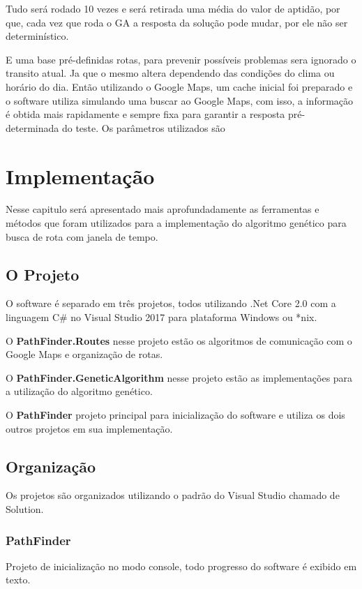 Tudo será rodado 10 vezes e será retirada uma média do valor de aptidão, por que, cada vez que roda o GA a resposta da solução pode mudar, por ele não ser determinístico.

E uma base pré-definidas rotas, para prevenir possíveis problemas sera ignorado o transito atual. Ja que o mesmo altera dependendo das condições do clima ou horário do dia. Então utilizando o Google Maps, um cache inicial foi preparado e o software utiliza simulando uma buscar ao Google Maps, com isso, a informação é obtida mais rapidamente e sempre fixa para garantir a resposta pré-determinada do teste.
Os parâmetros utilizados são


\chapter{Implementação}
 
Nesse capitulo será apresentado mais aprofundadamente as ferramentas e métodos que foram utilizados para a implementação do algoritmo genético para busca de rota com janela de tempo.
 
\section{O Projeto}
O software é separado em três projetos, todos utilizando .Net Core 2.0 com a linguagem C\# no Visual Studio 2017 para plataforma Windows ou \**nix.

O \textbf{PathFinder.Routes} nesse projeto estão os algoritmos de comunicação com o Google Maps e organização de rotas.

O \textbf{PathFinder.GeneticAlgorithm} nesse projeto estão as implementações para a utilização do algoritmo genético.

O \textbf{PathFinder} projeto principal para inicialização do software e utiliza os dois outros projetos em sua implementação.

\section{Organização}
Os projetos são organizados utilizando o padrão do Visual Studio chamado de Solution.

\subsection{PathFinder}
Projeto de inicialização no modo console, todo progresso do software é exibido em texto.

